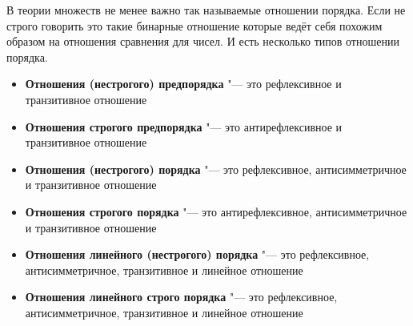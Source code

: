 \documentclass[a4paper, 16pt, oneside]{book}
\begin{document}
\par В теории множеств не менее важно так называемые отношении порядка.
Если не строго говорить это такие бинарные отношение которые ведёт себя похожим образом на отношения сравнения для чисел.
И есть несколько типов отношении порядка.

\begin{itemize}
	\item \textbf{Отношения (нестрогого) предпорядка} "--- это рефлексивное и транзитивное отношение
	\item \textbf{Отношения строгого предпорядка} "--- это антирефлексивное и транзитивное отношение
	\item \textbf{Отношения (нестрогого) порядка} "--- это рефлексивное, антисимметричное и транзитивное отношение
	\item \textbf{Отношения строгого порядка} "--- это антирефлексивное, антисимметричное и транзитивное отношение
	\item \textbf{Отношения линейного (нестрогого) порядка} "--- это рефлексивное, антисимметричное, транзитивное и линейное отношение
	\item \textbf{Отношения линейного строго порядка} "--- это рефлексивное, антисимметричное, транзитивное и линейное отношение
\end{itemize}
\end{document}
